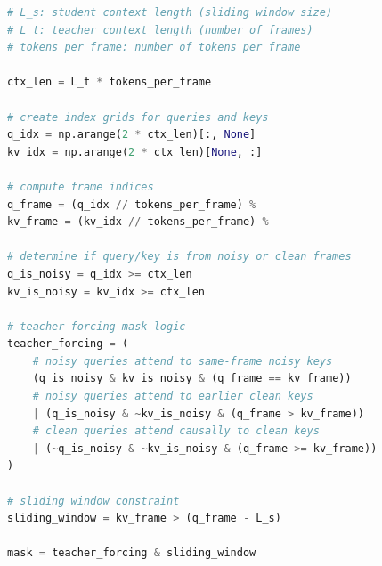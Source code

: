     
    
    
    
    
    
    
\begin{algorithm}[t]
\DontPrintSemicolon
\caption{Pseudocode of \texttt{TeacherForcingMask} in a NumPy-like style.}
\label{alg:teacher_forcing_mask}
\begin{lstlisting}[language=python]
# L_s: student context length (sliding window size)
# L_t: teacher context length (number of frames)
# tokens_per_frame: number of tokens per frame

ctx_len = L_t * tokens_per_frame

# create index grids for queries and keys
q_idx = np.arange(2 * ctx_len)[:, None]
kv_idx = np.arange(2 * ctx_len)[None, :]

# compute frame indices
q_frame = (q_idx // tokens_per_frame) %
kv_frame = (kv_idx // tokens_per_frame) %

# determine if query/key is from noisy or clean frames
q_is_noisy = q_idx >= ctx_len
kv_is_noisy = kv_idx >= ctx_len

# teacher forcing mask logic
teacher_forcing = (
    # noisy queries attend to same-frame noisy keys
    (q_is_noisy & kv_is_noisy & (q_frame == kv_frame))
    # noisy queries attend to earlier clean keys
    | (q_is_noisy & ~kv_is_noisy & (q_frame > kv_frame))
    # clean queries attend causally to clean keys
    | (~q_is_noisy & ~kv_is_noisy & (q_frame >= kv_frame))
)

# sliding window constraint
sliding_window = kv_frame > (q_frame - L_s)

mask = teacher_forcing & sliding_window
\end{lstlisting}
\end{algorithm}
